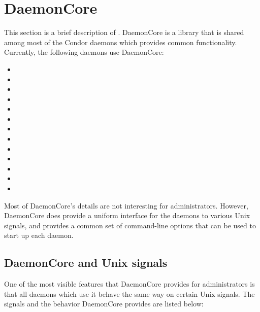 
\section{\label{sec:DaemonCore}DaemonCore}

This section is a brief description of .  DaemonCore
is a library that is shared among most of the Condor daemons which
provides common functionality.  Currently, the following daemons use
DaemonCore:

\begin{itemize}
\item {}
\item {}
\item {}
\item {}
\item {}
\item {}
\item {}
\item {}
\item {}
\item {}
\item {}
\item {}
\item {}
\end{itemize}

Most of DaemonCore's details are not interesting for administrators.
However, DaemonCore does provide a uniform interface for the daemons
to various Unix signals, and provides a common set of command-line
options that can be used to start up each daemon.

\subsection{\label{sec:DaemonCore-Signals}DaemonCore and Unix signals}

One of the most visible features that DaemonCore provides for
administrators is that all daemons which use it behave the same way on
certain Unix signals.  The signals and the behavior DaemonCore
provides are listed below:

